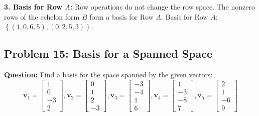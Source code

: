 \documentclass[12pt]{article}
\begin{document}
\textbf{3. Basis for Row $A$:}
Row operations do not change the row space. The nonzero rows of the echelon form $B$ form a basis for Row $A$.
Basis for Row $A$: $\left\{ (1, 0, 6, 5), (0, 2, 5, 3) \right\}$.

\subsection{Problem 15: Basis for a Spanned Space}
\textbf{Question:} Find a basis for the space spanned by the given vectors:
\[ \mathbf{v}_1 = \begin{bmatrix} 1 \\ 0 \\ -3 \\ 2 \end{bmatrix}, \mathbf{v}_2 = \begin{bmatrix} 0 \\ 1 \\ 2 \\ -3 \end{bmatrix}, \mathbf{v}_3 = \begin{bmatrix} -3 \\ -4 \\ 1 \\ 6 \end{bmatrix}, \mathbf{v}_4 = \begin{bmatrix} 1 \\ -3 \\ -8 \\ 7 \end{bmatrix}, \mathbf{v}_5 = \begin{bmatrix} 2 \\ 1 \\ -6 \\ 9 \end{bmatrix} \]
\end{document}
